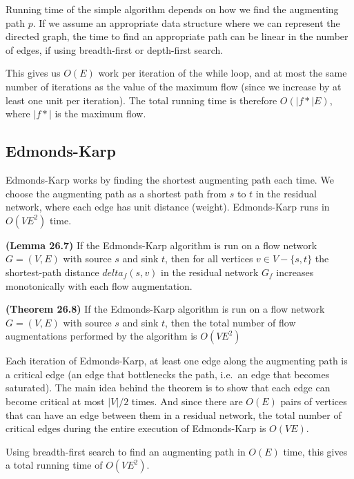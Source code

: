 Running time of the simple algorithm depends on how we find the augmenting path $p$.
If we assume an appropriate data structure where we can represent the directed graph,
the time to find an appropriate path can be linear in the number of edges, if using
breadth-first or depth-first search. 

This gives us $O(E)$ work per iteration of the while loop, and at most the same number of
iterations as the value of the maximum flow (since we increase by at least one unit per iteration).
The total running time is therefore $O(|f*| E)$, where $|f*|$ is the maximum flow.

\subsection{Edmonds-Karp}
Edmonds-Karp works by finding the shortest augmenting path each time. We choose the augmenting path
as a shortest path from $s$ to $t$ in the residual network, where each edge has unit distance (weight).
Edmonds-Karp runs in $O(VE^2)$ time. 

\textbf{(Lemma 26.7)}
If the Edmonds-Karp algorithm is run on a flow network $G = (V,E)$ with source $s$
and sink $t$, then for all vertices $v\in V - \{s,t\}$ the shortest-path distance $delta_f(s,v)$
in the residual network $G_f$ increases monotonically with each flow augmentation.

\textbf{(Theorem 26.8)}
If the Edmonds-Karp algorithm is run on a flow network $G = (V,E)$ with source $s$
and sink $t$, then the total number of flow augmentations performed by the algorithm
is $O(V E^2)$

Each iteration of Edmonds-Karp, at least one edge along the augmenting path is
a critical edge (an edge that bottlenecks the path, i.e.\ an edge that becomes
saturated). The main idea behind the theorem is to show that each edge can
become critical at most $|V|/2$ times. And since there are $O(E)$ pairs of
vertices that can have an edge between them in a residual network, the total
number of critical edges during the entire execution of Edmonds-Karp is
$O(VE)$.

Using breadth-first search to find an augmenting path in $O(E)$ time, this gives a total running
time of $O(V E^2)$.